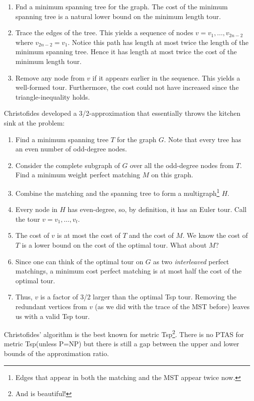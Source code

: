 \documentclass[11pt]{article}
\newcommand{\TSP}{{\sc Tsp}\xspace}
\begin{document}
\begin{enumerate}
	\item Fnd a minimum spanning tree for the graph.  The cost of the minimum spanning tree is a natural lower bound on the minimum length tour.
	\item Trace the edges of the tree.  This yields a sequence of nodes $v=v_{1}, \ldots, v_{2n-2}$ where $v_{2n-2}=v_{1}$.  Notice this path has length at most twice the length of the minimum spanning tree.  Hence it has length at most twice the cost of the minimum length tour.
	\item Remove any node from $v$ if it appears earlier in the sequence.  This yields a well-formed tour.  Furthermore, the cost could not have increased since the triangle-inequality holds.
\end{enumerate}
Christofides developed a 3/2-approximation that essentially throws the kitchen sink at the problem:
\begin{enumerate}
	\item Find a minimum spanning tree $T$ for the graph $G$.  Note that every tree has an even number of odd-degree nodes.
	\item Consider the complete subgraph of $G$ over all the odd-degree nodes from $T$.  Find a minimum weight perfect matching $M$ on this graph.
	\item Combine the matching and the spanning tree to form a multigraph\footnote{Edges that appear in both
	the matching and the MST appear twice now.} $H$.
	\item Every node in $H$ has even-degree, so, by definition, it has an Euler tour.  Call the tour $v=v_{1}, \ldots, v_{t}$.
	\item The cost of $v$ is at most the cost of $T$ and the cost of $M$.  We know the cost of $T$ is a lower bound on the cost of the optimal tour.  What about $M$?
	\item Since one can think of the optimal tour on $G$ as two {\em interleaved} perfect matchings, a minimum cost perfect matching  is at most half the cost of the optimal tour.
	\item Thus, $v$ is a factor of 3/2 larger than the optimal \TSP tour.  Removing the redundant vertices from $v$ (as we did with the trace of the MST before) leaves us with a valid \TSP tour.  
\end{enumerate}

Christofides' algorithm is the best known for metric \TSP\footnote{And is beautiful!}.  There is no PTAS for metric \TSP (unless P=NP) but there is still a gap between the upper and lower bounds of the approximation ratio.  
\end{document}
